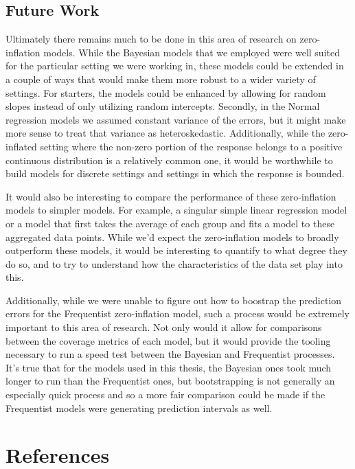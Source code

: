 \documentclass[12pt,twoside]{reedthesis}
\begin{document}
\hypertarget{future-work}{%
\section{Future Work}\label{future-work}}

Ultimately there remains much to be done in this area of research on zero-inflation models. While the Bayesian models that we employed were well suited for the particular setting we were working in, these models could be extended in a couple of ways that would make them more robust to a wider variety of settings. For starters, the models could be enhanced by allowing for random slopes instead of only utilizing random intercepts. Secondly, in the Normal regression models we assumed constant variance of the errors, but it might make more sense to treat that variance as heteroskedastic. Additionally, while the zero-inflated setting where the non-zero portion of the response belongs to a positive continuous distribution is a relatively common one, it would be worthwhile to build models for discrete settings and settings in which the response is bounded.

It would also be interesting to compare the performance of these zero-inflation models to simpler models. For example, a singular simple linear regression model or a model that first takes the average of each group and fits a model to these aggregated data points. While we'd expect the zero-inflation models to broadly outperform these models, it would be interesting to quantify to what degree they do so, and to try to understand how the characteristics of the data set play into this.

Additionally, while we were unable to figure out how to boostrap the prediction errors for the Frequentist zero-inflation model, such a process would be extremely important to this area of research. Not only would it allow for comparisons between the coverage metrics of each model, but it would provide the tooling necessary to run a speed test between the Bayesian and Frequentist processes. It's true that for the models used in this thesis, the Bayesian ones took much longer to run than the Frequentist ones, but bootstrapping is not generally an especially quick process and so a more fair comparison could be made if the Frequentist models were generating prediction intervals as well.

\backmatter

\hypertarget{references}{%
\chapter*{References}\label{references}}
\end{document}
